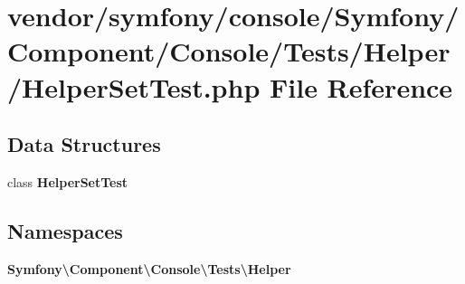 \section{vendor/symfony/console/\+Symfony/\+Component/\+Console/\+Tests/\+Helper/\+Helper\+Set\+Test.php File Reference}
\label{_helper_set_test_8php}
\subsection*{Data Structures}
\begin{DoxyCompactItemize}
\item 
class {\bf Helper\+Set\+Test}
\end{DoxyCompactItemize}
\subsection*{Namespaces}
\begin{DoxyCompactItemize}
\item 
 {\bf Symfony\textbackslash{}\+Component\textbackslash{}\+Console\textbackslash{}\+Tests\textbackslash{}\+Helper}
\end{DoxyCompactItemize}
